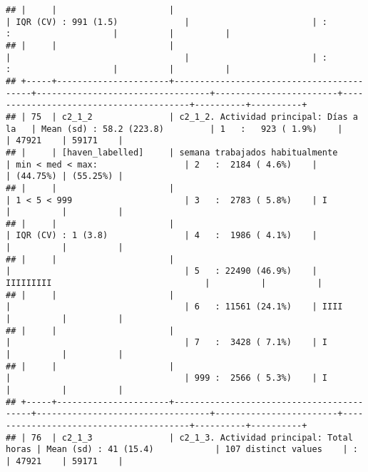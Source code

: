 \documentclass[]{article}
\begin{document}
\begin{verbatim}
## |     |                      |                                          | IQR (CV) : 991 (1.5)             |                        | :                 :                    |          |          |
## |     |                      |                                          |                                  |                        | :                 :                    |          |          |
## +-----+----------------------+------------------------------------------+----------------------------------+------------------------+----------------------------------------+----------+----------+
## | 75  | c2_1_2               | c2_1_2. Actividad principal: Días a la   | Mean (sd) : 58.2 (223.8)         | 1   :   923 ( 1.9%)    |                                        | 47921    | 59171    |
## |     | [haven_labelled]     | semana trabajados habitualmente          | min < med < max:                 | 2   :  2184 ( 4.6%)    |                                        | (44.75%) | (55.25%) |
## |     |                      |                                          | 1 < 5 < 999                      | 3   :  2783 ( 5.8%)    | I                                      |          |          |
## |     |                      |                                          | IQR (CV) : 1 (3.8)               | 4   :  1986 ( 4.1%)    |                                        |          |          |
## |     |                      |                                          |                                  | 5   : 22490 (46.9%)    | IIIIIIIII                              |          |          |
## |     |                      |                                          |                                  | 6   : 11561 (24.1%)    | IIII                                   |          |          |
## |     |                      |                                          |                                  | 7   :  3428 ( 7.1%)    | I                                      |          |          |
## |     |                      |                                          |                                  | 999 :  2566 ( 5.3%)    | I                                      |          |          |
## +-----+----------------------+------------------------------------------+----------------------------------+------------------------+----------------------------------------+----------+----------+
## | 76  | c2_1_3               | c2_1_3. Actividad principal: Total horas | Mean (sd) : 41 (15.4)            | 107 distinct values    | :                                      | 47921    | 59171    |

\end{verbatim}
\end{document}
